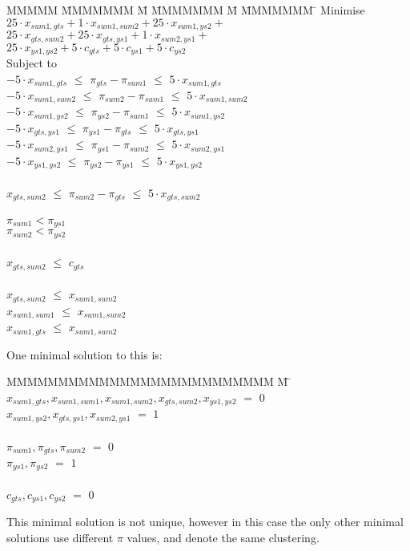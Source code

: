 \begin{tabbing}
MMMMM   \= MMMMMMM \= M \= MMMMMMM \= M \= MMMMMMM \= \kill
Minimise   \> $25 \cdot x_{sum1, gts} + 1 \cdot x_{sum1,sum2} + 25 \cdot x_{sum1, ys2} +$ \\
           \> $25 \cdot x_{gts, sum2} + 25 \cdot x_{gts, ys1} + 1 \cdot x_{sum2, ys1} +$ \\
           \> $ 25 \cdot x_{ys1, ys2} + 5 \cdot c_{gts} + 5 \cdot c_{ys1} + 5 \cdot c_{ys2} $\\
Subject to \\
    \> $-5 \cdot x_{sum1, gts}$  \> $\le$ \> $\pi_{gts} - \pi_{sum1}$  \> $\le$ \> $5 \cdot x_{sum1, gts}$  \\
    \> $-5 \cdot x_{sum1, sum2}$ \> $\le$ \> $\pi_{sum2} - \pi_{sum1}$ \> $\le$ \> $5 \cdot x_{sum1, sum2}$ \\
    \> $-5 \cdot x_{sum1, ys2 }$ \> $\le$ \> $\pi_{ys2 } - \pi_{sum1}$ \> $\le$ \> $5 \cdot x_{sum1, ys2 }$ \\
    \> $-5 \cdot x_{gts,  ys1 }$ \> $\le$ \> $\pi_{ys1 } - \pi_{gts }$ \> $\le$ \> $5 \cdot x_{gts, ys1  }$ \\
    \> $-5 \cdot x_{sum2, ys1 }$ \> $\le$ \> $\pi_{ys1 } - \pi_{sum2}$ \> $\le$ \> $5 \cdot x_{sum2, ys1 }$ \\
    \> $-5 \cdot x_{ys1, ys2  }$ \> $\le$ \> $\pi_{ys2 } - \pi_{ys1 }$ \> $\le$ \> $5 \cdot x_{ys1, ys2  }$ \\
\\
    \> $   x_{gts, sum2 }$ \> $\le$ \> $\pi_{sum2} - \pi_{gts }$ \> $\le$ \> $5 \cdot x_{gts, sum2 }$ \\
\\
    \>                     \>       \> $\pi_{sum1} < \pi_{ys1}$ \\
    \>                     \>       \> $\pi_{sum2} < \pi_{ys2}$ \\
\\
    \> $ x_{gts,sum2} $    \> $\le$ \> $c_{gts}$ \\
\\
    \> $x_{gts, sum2}$     \> $\le$ \> $x_{sum1, sum2}$ \\
    \> $x_{sum1,sum1}$     \> $\le$ \> $x_{sum1, sum2}$ \\
    \> $x_{sum1, gts}$     \> $\le$ \> $x_{sum1, sum2}$
\end{tabbing}

One minimal solution to this is:
\begin{tabbing}
MMMMMMMMMMMMMMMMMMMMMMMMMM \= M \= \kill
$x_{sum1, gts}, x_{sum1, sum1}, x_{sum1, sum2}, x_{gts, sum2}, x_{ys1,  ys2}$
    \> $=$ \> $0$ \\
$x_{sum1, ys2}, x_{gts, ys1 }, x_{sum2, ys1}$
    \> $=$ \> $1$ \\
\\
$\pi_{sum1}, \pi_{gts }, \pi_{sum2}$
    \> $=$ \> $0$ \\
$\pi_{ys1 }, \pi_{ys2 }$
    \> $=$ \> $1$ \\
\\
$c_{gts}, c_{ys1}, c_{ys2}$           
    \> $=$ \> $0$
\end{tabbing}
This minimal solution is not unique, however in this case the only other minimal solutions use different $\pi$ values, and denote the same clustering.

